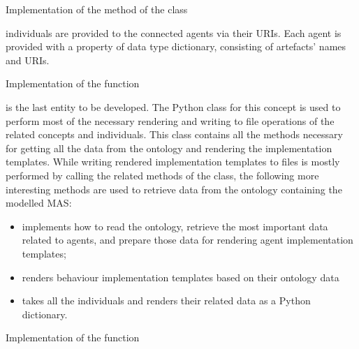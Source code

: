 \begin{listing}
    \caption{Implementation of the  method of the  class}
    \label{lst: mago-ag plan get_plan_action_behaviour_objective}
\end{listing}



individuals are provided to the connected agents via their \acp{URI}.
%
Each agent is provided with a property of data type dictionary,
%
consisting of artefacts' names and \acp{URI}.

\begin{listing}
    \caption{Implementation of the  function}
    \label{lst: mago-ag aux get_related_knowledge_artefact_uris}
\end{listing}



is the last entity to be developed. The Python class for this concept is used to perform most of the necessary rendering and writing to file operations of the related concepts and individuals. This class contains all the methods necessary for getting all the data from the ontology and rendering the implementation templates. While writing rendered implementation templates to files is mostly performed by calling the related methods of the  class, the following more interesting methods are used to retrieve data from the ontology containing the modelled \ac{MAS}:

\begin{itemize}
    \item {} implements how to read the ontology, retrieve the most important data related to agents, and prepare those data for rendering agent implementation templates;
    \item {} renders behaviour implementation templates based on their ontology data
    \item {} takes all the  individuals and renders their related data as a Python dictionary.
\end{itemize}

\begin{listing}
    \caption{Implementation of the  function}
    \label{lst: mago-ag aux get_related_knowledge_artefact_uris}
\end{listing}


